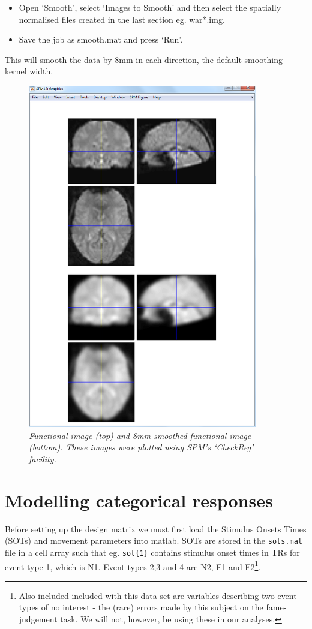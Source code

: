 \documentclass[a4paper,titlepage]{book}
\newcommand{\bi}{\begin{itemize}}
\newcommand{\ei}{\end{itemize}}
\begin{document}
\bi
\item{Open `Smooth', select `Images to Smooth' and then 
select the spatially normalised files created in the 
last section eg. {\sf war*.img}. }
\item{Save the job as {\sf smooth.mat} and press `Run'.}
\ei
This will smooth the data by 8mm in each direction, 
the default smoothing kernel width.
\begin{figure}
\begin{center}
\includegraphics[width=100mm]{smooth}
\caption{\em Functional image (top) and 8mm-smoothed functional image (bottom). These images were plotted using SPM's `CheckReg' facility. \label{face_smooth}}
\end{center}
\end{figure}

\section{Modelling categorical responses}


Before setting up the design matrix we must first 
load the Stimulus Onsets Times (SOTs) and movement
parameters into matlab. SOTs are stored in the 
\verb!sots.mat! file in a 
cell array such that eg. \verb!sot{1}! contains 
stimulus onset times in TRs for event type 1, which is N1. Event-types 2,3 and 4 are N2, F1 and F2\footnote{Also included included with this data set are variables describing two event-types of no interest - the (rare) errors made by this subject on the fame-judgement task. 
We will not, however, be using these in our analyses.}.
\end{document}
